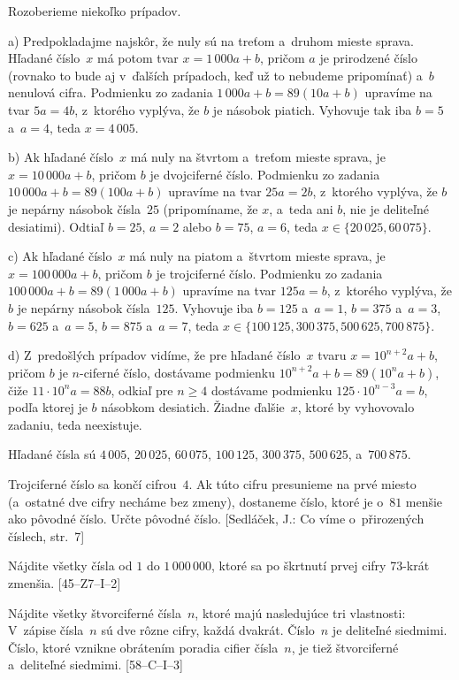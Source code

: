 {%
Rozoberieme niekoľko prípadov.

a) Predpokladajme najskôr, že nuly sú na treťom a~druhom mieste sprava.
Hľadané číslo~$x$ má potom tvar $x=1\,000 a+b$, pričom $a$ je prirodzené číslo
(rovnako to bude aj v~ďalších prípadoch, keď už to nebudeme pripomínať)
a~$b$ nenulová cifra. Podmienku zo zadania $1\,000a+b=89(10a+b)$ upravíme na
tvar $5a=4b$, z~ktorého vyplýva, že $b$ je násobok piatich.
Vyhovuje tak iba $b=5$ a~$a=4$, teda $x = 4\,005$.

b) Ak hľadané číslo~$x$ má nuly na štvrtom a~treťom mieste sprava,
je $x=10\,000a+b$, pričom $b$ je dvojciferné číslo.
Podmienku zo zadania $10\,000a+b=89(100a+b)$ upravíme na tvar $25a= 2b$, z~ktorého vyplýva,
že $b$ je nepárny násobok čísla~$25$ (pripomíname, že $x$, a~teda ani $b$, nie je
deliteľné desiatimi). Odtiaľ $b=25$, $a=2$ alebo $b=75$, $a=6$, teda $x\in\{20\,025,60\,075\}$.

c) Ak hľadané číslo~$x$ má nuly na piatom a~štvrtom mieste sprava, je $x=100\,000a+b$,
pričom $b$ je trojciferné číslo.
Podmienku zo zadania $100\,000a+b=89(1\,000a+b)$ upravíme na tvar $125a=b$, z~ktorého vyplýva,
že $b$ je nepárny násobok čísla~$125$. Vyhovuje iba $b=125$ a~$a=1$, $b=375$ a~$a=3$,
$b=625$ a~$a=5$, $b=875$ a~$a=7$, teda $x\in\{100\,125, 300\,375, 500\,625,\allowbreak 700\,875\}$.

d) Z~predošlých prípadov vidíme, že pre hľadané číslo~$x$ tvaru
$x=10^{n+2}a+b$, pričom $b$ je $n$-ciferné číslo, dostávame podmienku
$10^{n+2}a+b=89(10^{n}a+b)$, čiže $11\cdot 10^{n}a=88b$, odkiaľ pre
$n\ge 4$ dostávame podmienku $125\cdot 10^{n-3}a=b$, podľa ktorej je $b$ násobkom desiatich.
Žiadne ďalšie~$x$, ktoré by vyhovovalo zadaniu, teda neexistuje.

\zaver
Hľadané čísla sú $4\,005$, $20\,025$, $60\,075$, $100\,125$, $300\,375$, $500\,625$, a~$700\,875$.


Trojciferné číslo sa končí cifrou~$4$. Ak túto cifru presunieme na prvé miesto (a~ostatné dve
cifry necháme bez zmeny), dostaneme číslo, ktoré je o~$81$ menšie ako pôvodné číslo. Určte
pôvodné číslo. [Sedláček, J.: Co víme o~přirozených číslech, str.~7]

Nájdite všetky čísla od $1$ do $1\,000\,000$, ktoré sa po škrtnutí prvej cifry 73-krát zmenšia.
[45--Z7--I--2]

Nájdite všetky štvorciferné čísla~$n$, ktoré majú nasledujúce tri vlastnosti: V~zápise čísla~$n$ sú dve
rôzne cifry, každá dvakrát. Číslo~$n$ je deliteľné siedmimi. Číslo, ktoré vznikne obrátením poradia cifier
čísla~$n$, je tiež štvorciferné a~deliteľné siedmimi. [58--C--I--3]

}

